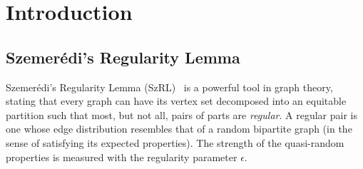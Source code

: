 \section{Introduction} \label{sec:introduction}

    \subsection{Szemerédi's Regularity Lemma}

        Szemerédi's Regularity Lemma (SzRL)~\cite{regular_partitions_of_graphs} is a powerful tool in graph theory,
        stating that every graph can have its vertex set decomposed into an equitable partition such that most,
        but not all, pairs of parts are \emph{regular}.
        A regular pair is one whose edge distribution resembles that of a random bipartite graph (in the sense of
        satisfying its expected properties).
        The strength of the quasi-random properties is measured with the regularity parameter $\epsilon$.

